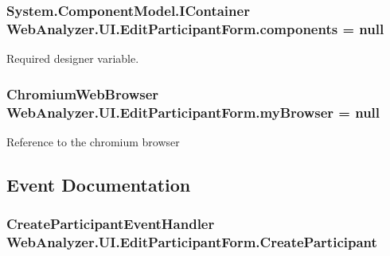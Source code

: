 \subsubsection[{components}]{\setlength{\rightskip}{0pt plus 5cm}System.\+Component\+Model.\+I\+Container Web\+Analyzer.\+U\+I.\+Edit\+Participant\+Form.\+components = null\hspace{0.3cm}{\ttfamily [private]}}\label{class_web_analyzer_1_1_u_i_1_1_edit_participant_form_a4f0de47592baefdf0d9bb214dd0aa562}


Required designer variable. 

\hypertarget{class_web_analyzer_1_1_u_i_1_1_edit_participant_form_a6d84e654a3d464fcd61e2b6c4f96956e}{}
\subsubsection[{my\+Browser}]{\setlength{\rightskip}{0pt plus 5cm}Chromium\+Web\+Browser Web\+Analyzer.\+U\+I.\+Edit\+Participant\+Form.\+my\+Browser = null\hspace{0.3cm}{\ttfamily [private]}}\label{class_web_analyzer_1_1_u_i_1_1_edit_participant_form_a6d84e654a3d464fcd61e2b6c4f96956e}


Reference to the chromium browser 



\subsection{Event Documentation}
\hypertarget{class_web_analyzer_1_1_u_i_1_1_edit_participant_form_a3c5b726a8fd6993ccc519319a6850ce3}{}
\subsubsection[{Create\+Participant}]{\setlength{\rightskip}{0pt plus 5cm}Create\+Participant\+Event\+Handler Web\+Analyzer.\+U\+I.\+Edit\+Participant\+Form.\+Create\+Participant}\label{class_web_analyzer_1_1_u_i_1_1_edit_participant_form_a3c5b726a8fd6993ccc519319a6850ce3}


